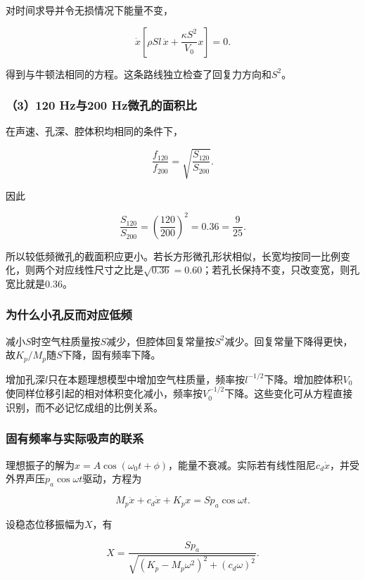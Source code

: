 \documentclass[12pt,a4paper,fontset=fandol]{ctexart}
\begin{document}
对时间求导并令无损情况下能量不变，

\[
\dot x\left[\rho Sl\,\ddot x+
\frac{\kappa S^2}{V_0}x\right]=0.
\]

得到与牛顿法相同的方程。这条路线独立检查了回复力方向和\(S^2\)。

\subsubsection{（3）120 Hz与200
Hz微孔的面积比}\label{hzux4e0e200-hzux5faeux5b54ux7684ux9762ux79efux6bd4}

在声速、孔深、腔体积均相同的条件下，

\[
\frac{f_{120}}{f_{200}}
=\sqrt{\frac{S_{120}}{S_{200}}}.
\]

因此

\[
\boxed{
\frac{S_{120}}{S_{200}}
=\left(\frac{120}{200}\right)^2
=0.36=\frac9{25}}.
\]

所以较低频微孔的截面积应更小。若长方形微孔形状相似，长宽均按同一比例变化，则两个对应线性尺寸之比是\(\sqrt{0.36}=0.60\)；若孔长保持不变，只改变宽，则孔宽比就是0.36。

\subsubsection{为什么小孔反而对应低频}\label{ux4e3aux4ec0ux4e48ux5c0fux5b54ux53cdux800cux5bf9ux5e94ux4f4eux9891}

减小\(S\)时空气柱质量按\(S\)减少，但腔体回复常量按\(S^2\)减少。回复常量下降得更快，故\(K_p/M_p\)随\(S\)下降，固有频率下降。

增加孔深\(l\)只在本题理想模型中增加空气柱质量，频率按\(l^{-1/2}\)下降。增加腔体积\(V_0\)使同样位移引起的相对体积变化减小，频率按\(V_0^{-1/2}\)下降。这些变化可从方程直接识别，而不必记忆成组的比例关系。

\subsubsection{固有频率与实际吸声的联系}\label{ux56faux6709ux9891ux7387ux4e0eux5b9eux9645ux5438ux58f0ux7684ux8054ux7cfb}

理想振子的解为\(x=A\cos(\omega_0t+\phi)\)，能量不衰减。实际若有线性阻尼\(c_d\dot x\)，并受外界声压\(p_a\cos\omega t\)驱动，方程为

\[
M_p\ddot x+c_d\dot x+K_px=Sp_a\cos\omega t.
\]

设稳态位移振幅为\(X\)，有

\[
X=\frac{Sp_a}
{\sqrt{(K_p-M_p\omega^2)^2+(c_d\omega)^2}}.
\]
\end{document}
